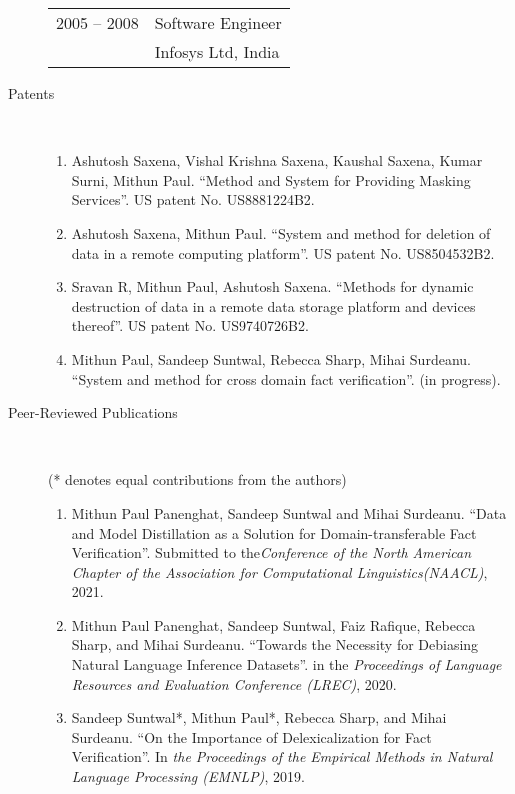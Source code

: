 \documentclass[10pt]{article}
\newcommand{\ve}[1]{{\em #1}} %
\newcommand{\ti}[1]{``#1''} %
\begin{document}
\begin{description}
\begin{tabular}{lp{4.9in}}
\hspace{-.2cm}2005 -- 2008 & Software Engineer	\\
& {\sc Infosys Ltd, India}
\end{tabular}

\item [Patents] \
\begin{enumerate}


\item
Ashutosh Saxena, Vishal Krishna Saxena, Kaushal Saxena, Kumar Surni, Mithun Paul. \ti{Method and System for Providing Masking Services}.  US patent No. US8881224B2.
\item
Ashutosh Saxena, Mithun Paul. \ti{System and method for deletion of data in a remote computing platform}.  US patent No. US8504532B2.
\item
Sravan R, Mithun Paul, Ashutosh Saxena. \ti{Methods for dynamic destruction of data in a remote data storage platform and devices thereof}.  US patent No. US9740726B2.
\item
Mithun Paul, Sandeep Suntwal, Rebecca Sharp, Mihai Surdeanu. \ti{System and method for cross domain fact verification}. (in progress).

\end{enumerate}
\bigskip
\item [ Peer-Reviewed  Publications]\


(* denotes equal contributions from the authors)

\begin{enumerate}




\item Mithun Paul Panenghat, Sandeep Suntwal and Mihai Surdeanu.   \ti{Data and Model Distillation as a Solution for Domain-transferable Fact Verification}. Submitted to the\ve {Conference of the North American Chapter of the Association for Computational Linguistics(NAACL)}, 2021.

\item Mithun Paul Panenghat, Sandeep Suntwal, Faiz Rafique, Rebecca Sharp, and Mihai Surdeanu.   \ti{Towards the Necessity for Debiasing Natural Language Inference Datasets}. in the \ve{ Proceedings of Language Resources and Evaluation Conference (LREC)}, 2020.

\item Sandeep Suntwal*, Mithun Paul*, Rebecca Sharp, and Mihai Surdeanu.   \ti{On the Importance of Delexicalization for Fact Verification}. In \ve{the Proceedings of the Empirical Methods in Natural Language Processing (EMNLP)}, 2019.


\end{enumerate}
\end{description}
\end{document}
